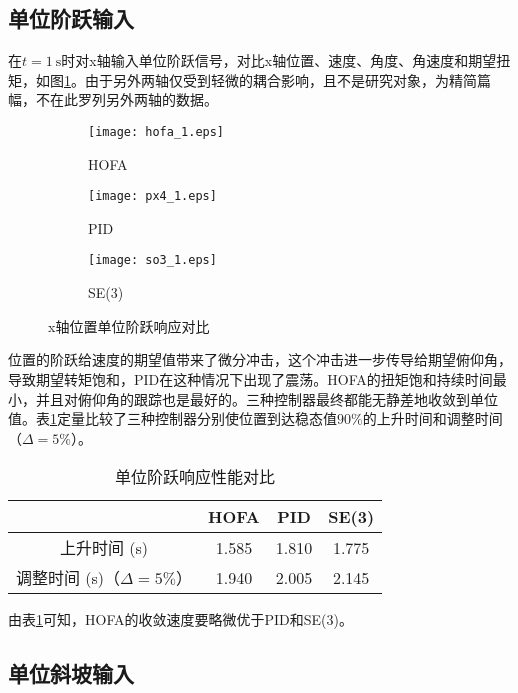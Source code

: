 \subsection*{单位阶跃输入}

  在$t=1 \ \text{s}$时对x轴输入单位阶跃信号，对比x轴位置、速度、角度、角速度和期望扭矩，如图\ref{MATLAB_阶跃}。由于另外两轴仅受到轻微的耦合影响，且不是研究对象，为精简篇幅，不在此罗列另外两轴的数据。
\newpage
\newpage
\begin{figure}[!htp]
  \centering
  \begin{subfigure}[t]{0.49\textwidth}
    \centering
    \texttt{[image: hofa\_1.eps]}
    \caption{HOFA}
  \end{subfigure}\hfill
  \begin{subfigure}[t]{0.49\textwidth}
    \centering
    \texttt{[image: px4\_1.eps]}
    \caption{PID}
  \end{subfigure}\hfill
  \begin{subfigure}[t]{0.49\textwidth}
    \centering
    \texttt{[image: so3\_1.eps]}
    \caption{SE(3)}
  \end{subfigure}
  \caption{x轴位置单位阶跃响应对比}
  \label{MATLAB_阶跃}
\end{figure}

位置的阶跃给速度的期望值带来了微分冲击，这个冲击进一步传导给期望俯仰角，导致期望转矩饱和，PID在这种情况下出现了震荡。HOFA的扭矩饱和持续时间最小，并且对俯仰角的跟踪也是最好的。三种控制器最终都能无静差地收敛到单位值。表\ref{MATLAB阶跃对比}定量比较了三种控制器分别使位置到达稳态值$90\%$的上升时间和调整时间（$\Delta = 5\%$）。
\begin{table}[!h]
  \centering
  \caption{单位阶跃响应性能对比}
  \begin{tabular}{cccc}
      \toprule
      & HOFA & PID & SE(3) \\
      \midrule
    上升时间 (s) & 1.585 & 1.810 & 1.775\\
    调整时间 (s)（$\Delta = 5\%$） & 1.940 & 2.005 &2.145 \\
      \bottomrule
  \end{tabular}
  \label{MATLAB阶跃对比}
\end{table}
由表\ref{MATLAB阶跃对比}可知，HOFA的收敛速度要略微优于PID和SE(3)。

\subsection*{单位斜坡输入}

